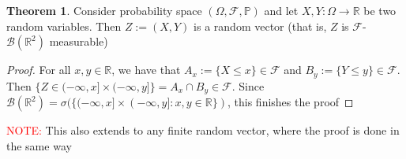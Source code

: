 \documentclass[11pt,a4paper]{article}
\theoremstyle{definition}
\newtheorem{theorem}{Theorem}[section]
\begin{document}
\begin{theorem}
    Consider probability space $(\Omega, \mathcal{F}, \mathbb{P})$ and let $X, Y: \Omega \to \mathbb{R}$ be two random variables. Then $Z := (X,Y)$ is a random vector (that is, $Z$ is $ \mathcal{F}$-$\mathcal{B}(\mathbb{R}^2)$ measurable)
\end{theorem}

\begin{proof}
    For all $x,y \in \mathbb{R}$, we have that $A_x := \{X \le x\} \in \mathcal{F}$ and $B_y := \{Y \le y\} \in \mathcal{F}$. Then $\{Z \in (-\infty, x] \times (-\infty, y]\} = A_x \cap B_y \in \mathcal{F}$. Since $\mathcal{B}(\mathbb{R}^2) = \sigma (\{(-\infty, x] \times (-\infty, y]:x,y\in \mathbb{R}\})$, this finishes the proof
\end{proof}
\noindent\textcolor{red}{NOTE:} This also extends to any finite random vector, where the proof is done in the same way
\end{document}
